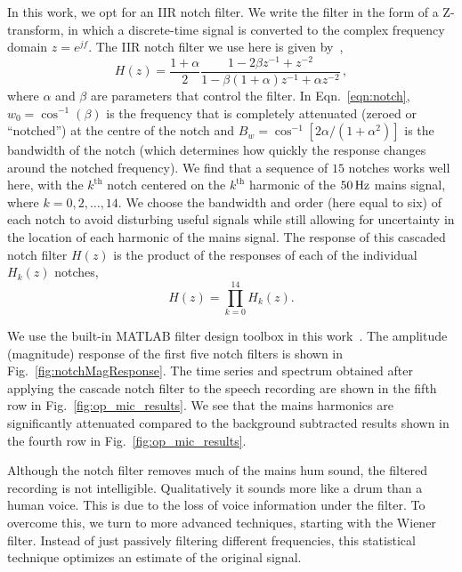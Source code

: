 \documentclass[aps,pra,superscriptaddress,reprint,nofootinbib]{revtex4-1}
\begin{document}
In this work, we opt for an IIR notch filter. 
We write the filter in the form of a Z-transform, in which a discrete-time signal is converted to the complex frequency domain $z=e^{jf}$. 
The IIR notch filter we use here is given by~\citep{10.5555/541204}, 
\begin{equation}
    \label{eqn:notch}
    H(z)=\frac{1+\alpha}{2}\frac{1-2\beta z^{-1}+z^{-2}}{1-\beta(1+\alpha)z^{-1}+\alpha z^{-2}}\,,
\end{equation}
where $\alpha$ and $\beta$ are parameters that control the filter. 
In Eqn.~\ref{eqn:notch}, $w_0=\cos^{-1}(\beta)$ is the frequency that is completely attenuated (zeroed or ``notched'') at the centre of the notch and $B_w=\cos^{-1}[2\alpha/(1+\alpha^2)]$ is the bandwidth of the notch (which determines how quickly the response changes around the notched frequency).
We find that a sequence of $15$ notches works well here, with the $k^\mathrm{th}$ notch centered on the $k^\mathrm{th}$ harmonic of the $50\,{\rm Hz}$ mains signal, where $k=0,2,\dots,14$. 
We choose the bandwidth and order (here equal to six) of each notch to avoid disturbing useful signals while still allowing for uncertainty in the location of each harmonic of the mains signal. The response of this cascaded notch filter $H(z)$ is the product of the responses of each of the individual $H_k(z)$ notches,
\begin{equation}
    \label{eqn:notch15}
    H(z) = \prod_{k=0}^{14} H_k(z).
\end{equation}

We use the built-in MATLAB filter design toolbox in this work~\cite{MATLAB}. 
The amplitude (magnitude) response of the first five notch filters is shown in Fig.~\ref{fig:notchMagResponse}. 
The time series and spectrum obtained after applying the cascade notch filter to the speech recording are shown in the fifth row in Fig.~\ref{fig:op_mic_results}.
We see that the mains harmonics are significantly attenuated compared to the background subtracted results shown in the fourth row in Fig.~\ref{fig:op_mic_results}.

Although the notch filter removes much of the mains hum sound, the filtered recording is not intelligible. Qualitatively it sounds more like a drum than a human voice. This is due to the loss of voice information under the filter.
To overcome this, we turn to more advanced techniques, starting with the Wiener filter. Instead of just passively filtering different frequencies, this statistical technique optimizes an estimate of the original signal. 
\end{document}
